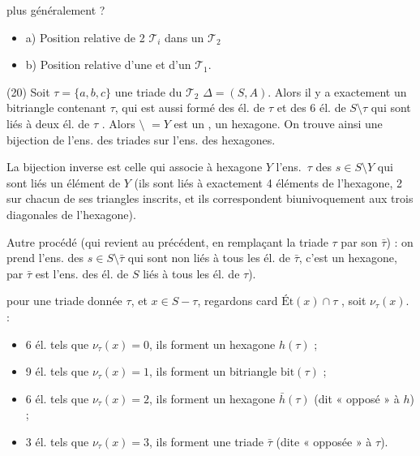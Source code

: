 \documentclass[11pt,a4paper]{article}
\begin{document}
 plus généralement ?
\begin{itemize}
  \item a) Position relative de 2 $\mathcal{T}_i$ \ill{} dans un $\mathcal{T}_2$
  \item b) Position relative d'une  et d'un $\mathcal{T}_1$.
\end{itemize}

(20)  Soit $\tau = \{a,b,c\}$ une triade du $\mathcal{T}_2$ $\Delta = (S,A)$. Alors \struck{\ill{}} il y a exactement un bitriangle contenant $\tau$, qui est aussi formé des él. de $\tau$ et des 6 él. de $S \setminus \tau$ qui sont liés à  deux él. de $\tau$ . Alors  $\setminus$ \struck{$\tau$} $= Y$ est un  , \ill{} un hexagone. On trouve ainsi une bijection de l'ens. des triades sur l'ens. des hexagones.

La bijection inverse est celle qui associe à  hexagone $Y$ l'ens.\ $\tau$ des $s \in S \setminus Y$ qui sont liés \ill{} \ill{} un élément de $Y$ (ils sont liés à exactement 4 éléments  de l'hexagone, 2 sur chacun de ses triangles inscrits, et ils correspondent biunivoquement aux trois diagonales de l'hexagone).

Autre procédé (qui revient au précédent, en remplaçant la triade $\tau$ par son  $\bar\tau$) : on prend l'ens. des $s \in S \setminus \bar\tau$ qui sont non liés à tous les él. de $\bar\tau$, \struck{\ill{}} c'est \struck{\ill{}} un hexagone,   \ill{} par $\bar\tau$ est l'ens. des él. de $S$ liés à tous les él. de $\tau$).

 pour une triade donnée $\tau$, et $x \in S - \tau$, regardons \struck{\ill{}} card $\mathrm{Ét}(x) \cap \tau$ , soit $\nu_\tau(x)$.
 :
\begin{itemize}
  \item 6 él. tels que $\nu_\tau(x) = 0$, ils forment un hexagone $h(\tau)$ ;
  \item 9 él. tels que $\nu_\tau(x) = 1$, ils forment un bitriangle $\mathrm{bit}(\tau)$ ;
  \item 6 él. tels que $\nu_\tau(x) = 2$, ils forment un hexagone $\bar h(\tau)$ (dit « opposé » à $h$) ;
  \item 3 él. tels que $\nu_\tau(x) = 3$, ils forment une triade $\bar\tau$ (dite « opposée » à $\tau$).
\end{itemize}
\end{document}
